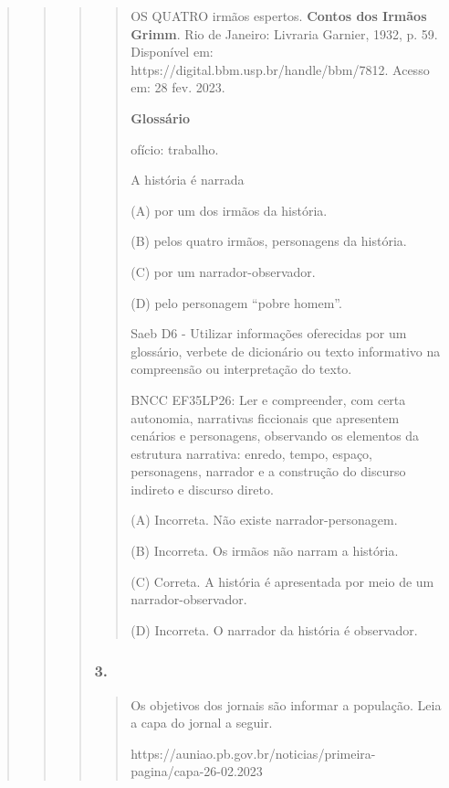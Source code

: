 \begin{quote}
\begin{quote}
\begin{quote}
\begin{quote}
OS QUATRO irmãos espertos. \textbf{Contos dos Irmãos Grimm}. Rio de
Janeiro: Livraria Garnier, 1932, p. 59. Disponível em:
https://digital.bbm.usp.br/handle/bbm/7812. Acesso em: 28 fev. 2023.

\textbf{Glossário}

ofício: trabalho.

A história é narrada

(A) por um dos irmãos da história.

(B) pelos quatro irmãos, personagens da história.

(C) por um narrador-observador.

(D) pelo personagem ``pobre homem''.

Saeb D6 - Utilizar informações oferecidas por um glossário, verbete de
dicionário ou texto informativo na compreensão ou interpretação do
texto.

BNCC EF35LP26: Ler e compreender, com certa autonomia, narrativas
ficcionais que apresentem cenários e personagens, observando os
elementos da estrutura narrativa: enredo, tempo, espaço, personagens,
narrador e a construção do discurso indireto e discurso direto.

(A) Incorreta. Não existe narrador-personagem.

(B) Incorreta. Os irmãos não narram a história.

(C) Correta. A história é apresentada por meio de um
narrador-observador.

(D) Incorreta. O narrador da história é observador.
\end{quote}

\subsubsection{3. }\label{section-92}

\begin{quote}
Os objetivos dos jornais são informar a população. Leia a capa do jornal
a seguir.

https://auniao.pb.gov.br/noticias/primeira-pagina/capa-26-02.2023


\end{quote}
\end{quote}
\end{quote}
\end{quote}
